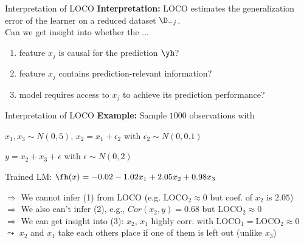 \documentclass[10pt,compress,t,notes=noshow, xcolor=table]{beamer}
\begin{document}
\begin{framev}[align=top]{Interpretation of LOCO}
\textbf{Interpretation:} LOCO estimates the generalization error of the learner on a reduced dataset $\D_{-j}$.\\
\spacer[0.25]
Can we get insight into whether the ...
\begin{enumerate}
\item feature $x_j$ is causal for the prediction $\yh$?
\item feature $x_j$ contains prediction-relevant information?
\item model requires access to $x_j$ to achieve its prediction performance?
\end{enumerate}
\end{framev}


\begin{framev}[align=top]{Interpretation of LOCO}
\textbf{Example:} Sample $1000$ observations with
\begin{itemizeM}
\item $x_1, x_3 \sim N(0, 5)$, $x_2 = x_1 + \epsilon_2$ with $\epsilon_2 \sim N(0, 0.1)$
\item $y = x_2 + x_3 + \epsilon$ with $\epsilon \sim N(0, 2)$
\item Trained LM: $\fh(x) = -0.02 - 1.02 x_1 + 2.05 x_2 + 0.98 x_3$
\end{itemizeM}
\pause
{}
\spacer[0.25]
\pause

$\Rightarrow$ We cannot infer (1) from LOCO (e.g. $\text{LOCO}_2 \approx 0$ but coef. of $x_2$ is $2.05$)\\
\pause
$\Rightarrow$ We also can't infer (2), e.g., $Cor(x_2, y) = 0.68$ but $\text{LOCO}_2 \approx 0$\\
\pause
$\Rightarrow$ We can get insight into (3): $x_2$, $x_1$ highly corr. with $\text{LOCO}_1 = \text{LOCO}_2 \approx 0$ \\
\phantom{$\Rightarrow$} $\leadsto$ $x_2$ and $x_1$ take each others place if one of them is left out (unlike $x_3$)
\end{framev}
\end{document}
